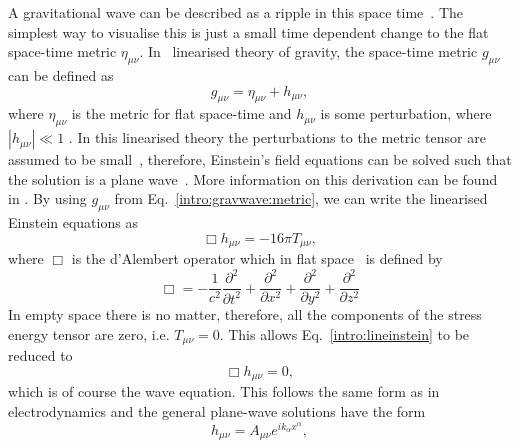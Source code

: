 A gravitational wave can be described as a ripple in this space time~.  The simplest way to
visualise this is just a small time dependent change to the flat space-time
metric $\eta_{\mu\nu}$.  In~ linearised theory of gravity, the
space-time metric $g_{\mu \nu}$ can be defined as
\begin{equation}
\label{intro:gravwave:metric}
    g_{\mu \nu} = \eta_{\mu \nu} + h_{\mu \nu},
\end{equation}
where $ \eta_{\mu \nu}$ is the metric for flat space-time and $h_{\mu \nu}$ is
some perturbation, where $|h_{\mu \nu}| \ll 1$
\citep{flanagan2005BasicsGravitational}.  In this linearised theory the
perturbations to the metric tensor are assumed to be small~, therefore, Einstein's field
equations can be solved such that the solution is a plane wave~.
More information on this derivation can be found in
\citep{flanagan2005BasicsGravitational,letiec2016TheoryGravitational}.  By
using $g_{\mu \nu}$ from Eq.~\ref{intro:gravwave:metric}, we can write the
linearised Einstein equations as
\begin{equation}
\label{intro:lineinstein}
    \Box h_{\mu \nu} = -16 \pi T_{\mu\nu},
\end{equation}
where $\Box$ is the d'Alembert operator which in flat space~ is defined by
\begin{equation}
		\Box = -\frac{1}{c^2} \frac{\partial^2}{\partial t^2} + \frac{\partial^2}{\partial x^2} + \frac{\partial^2}{\partial y^2} + \frac{\partial^2}{\partial z^2}
\end{equation}
In empty space there is no matter, therefore, all the components of the stress
energy tensor are zero, i.e. $T_{\mu \nu} = 0$.  This allows
Eq.~\ref{intro:lineinstein} to be reduced to
\begin{equation}
    \Box h_{\mu \nu} = 0,
\end{equation}
which is of course the wave equation.  This follows the same form as in
electrodynamics and the general plane-wave solutions have the form
\begin{equation}
    h_{\mu\nu} = A_{\mu\nu}e^{ik_{\alpha} x^{\alpha}},
\end{equation}
